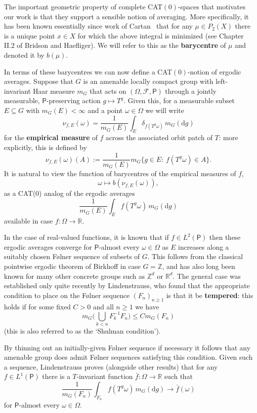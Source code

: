\documentclass{amsart}
\theoremstyle{remark}
\newcommand{\bbR}{\mathbb{R}}
\newcommand{\bbZ}{\mathbb{Z}}
\newcommand{\sfP}{\mathsf{P}}
\renewcommand{\d}{\mathrm{d}}
\newcommand{\F}{\mathcal{F}}
\renewcommand{\O}{\Omega}
\newcommand{\w}{\omega}
\begin{document}
The important geometric property of complete CAT$(0)$-spaces that
motivates our work is that they support a sensible notion of
averaging. More specifically, it has been known essentially since
work of Cartan~\cite{Car51} that for any $\mu \in P_2(X)$ there is a
unique point $x \in X$ for which the above integral is minimized
(see Chapter II.2 of Bridson and Haefliger). We will refer to this
as the \textbf{barycentre} of $\mu$ and denoted it by $b(\mu)$.

In terms of these barycentres we can now define a CAT$(0)$-notion of
ergodic averages. Suppose that $G$ is an amenable locally compact
group with left-invariant Haar measure $m_G$ that acts on
$(\O,\F,\sfP)$ through a jointly measurable, $\sfP$-preserving
action $g\mapsto T^g$.  Given this, for a measurable subset $E
\subseteq G$ with $m_G(E) < \infty$ and a point $\w \in \O$ we will
write
\[\nu_{f,E}(\w)= \frac{1}{m_G(E)}\int_E \delta_{f(T^g\w)}\,m_G(\d g)\]
for the \textbf{empirical measure} of $f$ across the associated
orbit patch of $T$: more explicitly, this is defined by
\[\nu_{f,E}(\w)(A) := \frac{1}{m_G(E)}m_G\{g\in E:\ f(T^g\w)\in A\}.\]
It is natural to view the function of barycentres of the empirical
measures of $f$,
\[\w \mapsto b(\nu_{f,E}(\w)),\]
as a CAT($0$) analog of the ergodic averages
\[\frac{1}{m_G(E)}\int_Ef(T^g\w)\,m_G(\d g)\]
available in case $f:\O\to\bbR$.

In the case of real-valued functions, it is known that if $f \in
L^2(\sfP)$ then these ergodic averages converge for $\sfP$-almost
every $\w \in \O$ as $E$ increases along a suitably chosen F\o lner
sequence of subsets of $G$.  This follows from the classical
pointwise ergodic theorem of Birkhoff in case $G = \bbZ$, and has
also long been known for many other concrete groups such as $\bbZ^d$
or $\bbR^d$. The general case was established only quite recently by
Lindenstrauss, who found that the appropriate condition to place on
the F\o lner sequence $(F_n)_{n\geq 1}$ is that it be
\textbf{tempered}: this holds if for some fixed $C > 0$ and all
$n\geq 1$ we have
\[m_G\Big(\bigcup_{k < n}F_k^{-1}F_n\Big) \leq Cm_G(F_n)\]
(this is also referred to as the `Shulman condition').

By thinning out an initially-given F\o lner sequence if necessary it
follows that any amenable group does admit F\o lner sequences
satisfying this condition.  Given such a sequence, Lindenstrauss
proves (alongside other results) that for any $f\in L^1(\sfP)$ there
is a $T$-invariant function $\bar{f}:\O\to \bbR$ such that
\[\frac{1}{m_G(F_n)}\int_{F_n}f(T^g\w)\,m_G(\d g) \to \bar{f}(\w)\]
for $\sfP$-almost every $\w \in \O$.
\end{document}
